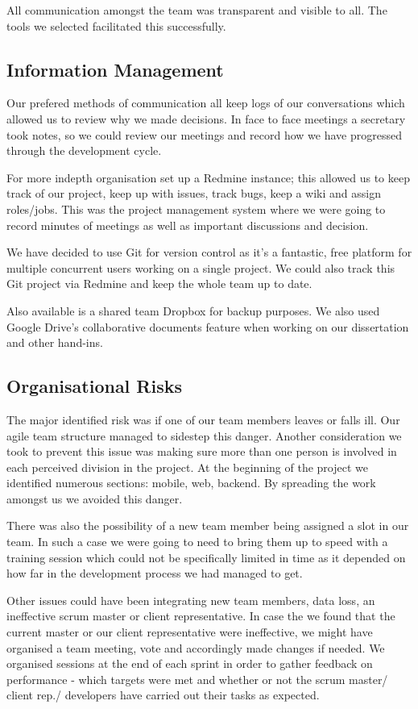 \documentclass{l3proj}
\begin{document}
All communication amongst the team was transparent and visible to all. The tools we selected facilitated this successfully.

\subsection{Information Management}Our prefered methods of communication all keep logs of our conversations which allowed us to review why we made decisions. In face to face meetings a secretary took notes, so we could review our meetings and record how we have progressed through the development cycle.

For more indepth organisation set up a Redmine instance; this allowed us to keep track of our project, keep up with issues, track bugs, keep a wiki and assign roles/jobs. This was the project management system where we were going to record minutes of meetings as well as important discussions and decision.

We have decided to use \gls{Git} for version control as it’s a fantastic, free platform for multiple concurrent users working on a single project. We could also track this Git project via Redmine and keep the whole team up to date.

Also available is a shared team Dropbox for backup purposes. We also used Google Drive’s collaborative documents feature when working on our dissertation and other hand-ins.

\subsection{Organisational Risks}The major identified risk was if one of our team members leaves or falls ill. Our agile team structure managed to sidestep this danger. Another consideration we took to prevent this issue was making sure more than one person is involved in each perceived division in the project. At the beginning of the project we identified numerous sections: mobile, web, backend. By spreading the work amongst us we avoided this danger.

There was also the possibility of a new team member being assigned a slot in our team. In such a case we were going to need to bring them up to speed with a training session which could not be specifically limited in time as it depended on how far in the development process we had managed to get.

Other issues could have been integrating new team members, data loss, an ineffective scrum master or client representative. In case the we found that the current master or our client representative were ineffective, we might have organised a team meeting, vote and accordingly made changes if needed. We organised sessions at the end of each sprint in order to gather feedback on performance - which targets were met and whether or not the scrum master/ client rep./ developers have carried out their tasks as expected.
\end{document}
